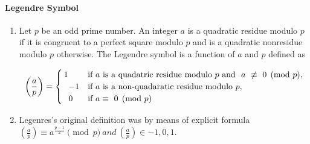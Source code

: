 \paragraph{Legendre Symbol}\begin{enumerate}

            
            \item 
                Let $\displaystyle p$ be an odd prime number. An integer $\displaystyle a$ is a quadratic residue
                    modulo
                    $\displaystyle p$ if it is congruent to a perfect square modulo $\displaystyle p$ and is a quadratic
                    nonresidue modulo $\displaystyle p$ otherwise. The Legendre symbol is a function of $\displaystyle
                    a$
                    and
                    $\displaystyle p$ defined as

                \[\displaystyle \displaystyle \left( \frac{a}{p} \right)=
                {\begin{cases}
                \,1&{\text{if }}a\ {\text{is a quadatric residue modulo }}p\ {\text{and }}\ a\ \not\equiv\ 0
                {\pmod{p}},\\\;\;\,-1&{\text{if }}a\ {\text{is a non-quadaratic residue modulo
                }}p,\\\;\;\,0&{\text{if
                }}a \equiv\ 0 {\pmod{p}}
                \end{cases}}\]
            
            \item 
                Legenres’s original definition was by means of explicit formula
                    $\displaystyle \left(\right)\equiv a^{}  \ and \
                    \left(\right).$


\end{enumerate}
